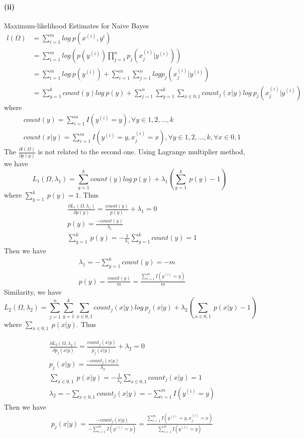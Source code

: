 \documentclass[UTF8]{article}
\begin{document}
\paragraph{(ii)} Maximum-likelihood Estimates for Naive Bayes
\begin{align*}
  l(\Omega) &=\sum_{i=1}^mlog\ p(x^{(i)},y^{i}) \\
  &=\sum_{i=1}^mlog \left(p(y^{(i)})\prod_{j=1}^np_j(x_j^{(i)}|y^{(i)})\right)\\
  &=\sum_{i=1}^mlog\ p(y^{(i)}) +\sum_{i=1}^m\sum_{j=1}^nlog p_j(x_j^{(i)}|y^{(i)}) \\
  &= \sum_{y=1}^kcount(y)log\ p(y) + \sum_{j=1}^n\sum_{y=1}^k\sum_{x\in{0,1}}count_j(x|y)log\ p_j(x_j^{(i)}|y^{(i)})
\end{align*}
where
\begin{align*}
  &count(y) = \sum_{i=1}^mI(y^{(i)}=y),\forall y \in 1,2,\dots,k \\
  &count(x|y) = \sum_{i=1}^mI(y^{(i)}=y,x_j^{(i)}=x),\forall y \in 1,2,\dots,k,\forall x \in 0,1
\end{align*}
The $\frac{\partial l(\Omega)}{\partial p(y)}$ is not related to the second one. Using Lagrange multiplier method, we have
$$L_1(\Omega,\lambda_1) = \sum_{y=1}^kcount(y)log\ p(y)+\lambda_1(\sum_{y=1}^k\ p(y)-1)$$
where $\sum_{y=1}^k\ p(y)=1$. Thus
\begin{align*}
&\frac{\partial L_1(\Omega,\lambda_1)}{\partial p(y)} =\frac{count(y)}{p(y)} + \lambda_1= 0 \\
&p(y) = \frac{-count(y)}{\lambda_1} \\
&\sum_{y=1}^k\ p(y) = -\frac{1}{\lambda_1}\sum_{y=1}^kcount(y) = 1
\end{align*}
Then we have
\begin{align*}
&\lambda_1 = - \sum_{y=1}^kcount(y) = -m \\
  &p(y) = \frac{count(y)}{m} = \frac{\sum_{i=1}^mI(y^{(i)}=y)}{m} \tag{$1$}
\end{align*}
Similarity, we have
$$L_2(\Omega,\lambda_2) = \sum_{j=1}^n\sum_{y=1}^k\sum_{x\in 0,1}count_j(x|y)log\ p_j(x|y)+\lambda_2(\sum_{x\in 0,1}\ p(x|y)-1)$$
where $\sum_{x\in 0,1}\ p(x|y)$. Thus

\begin{align*}
&\frac{\partial L_2(\Omega,\lambda_2)}{\partial p_j(x|y)} =\frac{count_j(x|y)}{p_j(x|y)} + \lambda_2= 0 \\
&p_j(x|y) = \frac{-count_j(x|y)}{\lambda_2} \\
&\sum_{x\in 0,1}\ p(x|y) = -\frac{1}{\lambda_2}\sum_{x\in 0,1}count_j(x|y) = 1\\
&\lambda_2 = -\sum_{x\in 0,1}count_j(x|y) = -\sum_{i=1}^mI(y^{(i)}=y)
\end{align*}
Then we have
\begin{align*}
  &p_j(x|y) = \frac{-count_j(x|y)}{-\sum_{i=1}^mI(y^{(i)}=y)} = \frac{\sum_{i=1}^mI(y^{(i)}=y,x_j^{(i)}=x)}{\sum_{i=1}^mI(y^{(i)}=y)} \tag{$2$}
\end{align*}
\end{document}
